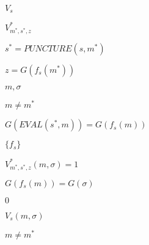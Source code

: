 \documentclass[10pt]{book}
\begin{document}
\begin{mdSnippets}
\begin{mdInlineSnippet}[6750565f0bbd54db7d5035c93bf73682]%
$V_s$\end{mdInlineSnippet}%
\begin{mdInlineSnippet}[dc4e2a7401a1ef3b058ca528acc04ca1]%
$V_{m^*,s^*,z}^*$\end{mdInlineSnippet}%
\begin{mdInlineSnippet}%
$s^* = PUNCTURE(s,m^*)$\end{mdInlineSnippet}%
\begin{mdInlineSnippet}[d4360a88f41025b5e44b037a00496489]%
$z =G(f_s(m^*))$\end{mdInlineSnippet}%
\begin{mdInlineSnippet}%
$m,\sigma$\end{mdInlineSnippet}%
\begin{mdInlineSnippet}[9676adf87c562ce01160e7c789a6f96e]%
$m \neq m^*$\end{mdInlineSnippet}%
\begin{mdInlineSnippet}%
$G(EVAL(s^*,m)) = G(f_s(m))$\end{mdInlineSnippet}%
\begin{mdInlineSnippet}[f0a0745b39ca7c74b201f7784e766521]%
$\{f_s\}$\end{mdInlineSnippet}%
\begin{mdInlineSnippet}[4ea5ac596cd7449a13b29af04d1057af]%
$V_{m^*,s^*,z}^*(m,\sigma) = 1$\end{mdInlineSnippet}%
\begin{mdInlineSnippet}[4d5b0c7bd0b99771bccd83ec4e069504]%
$G(f_s(m)) = G(\sigma)$\end{mdInlineSnippet}%
\begin{mdInlineSnippet}%
$0$\end{mdInlineSnippet}%
\begin{mdInlineSnippet}%
$V_s(m,\sigma)$\end{mdInlineSnippet}%
\begin{mdInlineSnippet}[9676adf87c562ce01160e7c789a6f96e]%
$m \neq m^*$\end{mdInlineSnippet}%

\end{mdSnippets}
\end{document}
